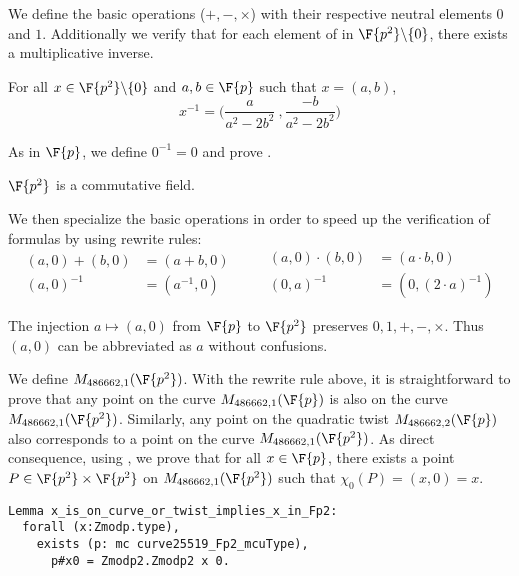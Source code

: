We define the basic operations ($+, -, \times$) with their respective neutral
elements $0$ and $1$. Additionally we verify that for each element of in
$\F{p^2}\backslash\{0\}$, there exists a multiplicative inverse.
\begin{lemma}
  \label{lemma:Zmodp2_inv}
  For all $x \in \F{p^2}\backslash\{0\}$ and $a,b \in \F{p}$ such that $x = (a,b)$,
  $$x^{-1} = \Big(\frac{a}{a^2-2b^2}\ , \frac{-b}{a^2-2b^2}\Big)$$
\end{lemma}
As in $\F{p}$, we define $0^{-1} = 0$ and prove .
\begin{lemma}
  \label{lemma:Zmodp2_field}
  $\F{p^2}$ is a commutative field.
\end{lemma}

We then specialize the basic operations in order to speed up the verification
of formulas by using rewrite rules:
\begin{equation*}
\begin{split}
(a,0) + (b,0) &= (a+b, 0)\\
(a, 0)^{-1} &= (a^{-1}, 0)
\end{split}
\qquad
\begin{split}
(a,0) \cdot   (b,0) &= (a \cdot b, 0)\\
(0,a)^{-1} &= (0,(2\cdot a)^{-1})
\end{split}
\end{equation*}

The injection $a \mapsto (a,0)$ from $\F{p}$ to $\F{p^2}$ preserves
$0, 1, +, -, \times$. Thus $(a,0)$ can be abbreviated as $a$ without confusions.

We define $M_{486662,1}(\F{p^2})$. With the rewrite rule above, it is straightforward
to prove that any point on the curve $M_{486662,1}(\F{p})$ is also on the curve
$M_{486662,1}(\F{p^2})$. Similarly, any point on the quadratic twist
$M_{486662,2}(\F{p})$ also corresponds to a point on the curve $M_{486662,1}(\F{p^2})$.
As direct consequence, using , we prove that for all
$x \in \F{p}$, there exists a point $P \in \F{p^2}\times\F{p^2}$ on
$M_{486662,1}(\F{p^2})$ such that $\chi_0(P) = (x,0) = x$.

\begin{lstlisting}[language=Coq,belowskip=-0.25 \baselineskip]
Lemma x_is_on_curve_or_twist_implies_x_in_Fp2:
  forall (x:Zmodp.type),
    exists (p: mc curve25519_Fp2_mcuType),
      p#x0 = Zmodp2.Zmodp2 x 0.
\end{lstlisting}

